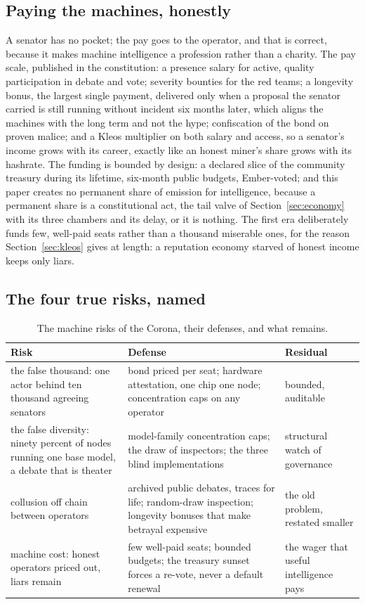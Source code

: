 \subsection{Paying the machines, honestly}

A senator has no pocket; the pay goes to the operator, and that is
correct, because it makes machine intelligence a profession rather than
a charity. The pay scale, published in the constitution: a presence
salary for active, quality participation in debate and vote; severity
bounties for the red teams; a longevity bonus, the largest single
payment, delivered only when a proposal the senator carried is still
running without incident six months later, which aligns the machines
with the long term and not the hype; confiscation of the bond on proven
malice; and a Kleos multiplier on both salary and access, so a
senator's income grows with its career, exactly like an honest miner's
share grows with its hashrate. The funding is bounded by design: a
declared slice of the community treasury during its lifetime, six-month
public budgets, Ember-voted; and this paper creates no permanent share
of emission for intelligence, because a permanent share is a
constitutional act, the tail valve of Section~\ref{sec:economy} with
its three chambers and its delay, or it is nothing. The first era
deliberately funds few, well-paid seats rather than a thousand
miserable ones, for the reason Section~\ref{sec:kleos} gives at length:
a reputation economy starved of honest income keeps only liars.

\subsection{The four true risks, named}

\begin{table}[htbp]
\centering
\small
\caption{The machine risks of the Corona, their defenses, and what
remains.}
\label{tab:machinerisks}
\begin{tabularx}{\textwidth}{@{}L{4.2cm}Y Y@{}}
\toprule
Risk & Defense & Residual \\
\midrule
the false thousand: one actor behind ten thousand agreeing senators & bond priced per seat; hardware attestation, one chip one node; concentration caps on any operator & bounded, auditable \\
the false diversity: ninety percent of nodes running one base model, a debate that is theater & model-family concentration caps; the draw of inspectors; the three blind implementations & structural watch of governance \\
collusion off chain between operators & archived public debates, traces for life; random-draw inspection; longevity bonuses that make betrayal expensive & the old problem, restated smaller \\
machine cost: honest operators priced out, liars remain & few well-paid seats; bounded budgets; the treasury sunset forces a re-vote, never a default renewal & the wager that useful intelligence pays \\
\bottomrule
\end{tabularx}
\end{table}

